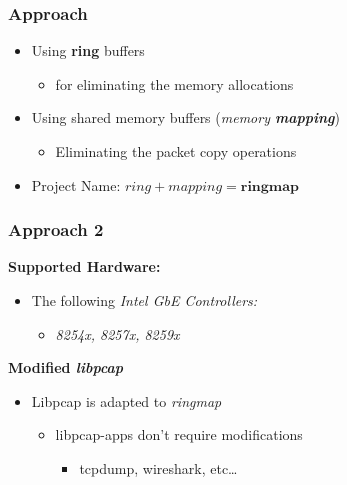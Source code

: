 \begin{frame}
\frametitle{Approach}
\begin{itemize}
	\item<1-> Using \textbf{ring} buffers
		\begin{itemize}
			\item<1-> for eliminating the memory allocations
		\end{itemize}

	\item<2-> Using shared memory buffers (\emph{memory \textbf{mapping}})
		\begin{itemize}
			\item<2-> Eliminating the packet copy operations				
		\end{itemize}
	\item<3->[$\Rightarrow$] Project Name: $ring + mapping = \textbf{ringmap}$
\end{itemize}
\end{frame}


\begin{frame}
\frametitle{Approach 2}
\textbf{Supported Hardware:}
\begin{itemize}
	\item The following \emph{Intel GbE Controllers:}
		\begin{itemize}
			\item \small{\emph{8254x, 8257x, 8259x}}\newline
		\end{itemize}
\end{itemize}

\textbf{Modified \emph{libpcap}}
\begin{itemize}
	\item Libpcap is adapted to \emph{ringmap}
	\begin{itemize}
		\item libpcap-apps don't require modifications
			\begin{itemize}
				\item tcpdump, wireshark, etc\ldots
			\end{itemize}
	\end{itemize}
\end{itemize}
\end{frame}

